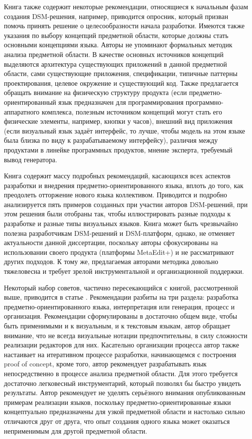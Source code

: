 Книга также содержит некоторые рекомендации, относящиеся к начальным фазам создания 
\ac{DSM}-решения, например, приводится опросник, который призван помочь принять решение о 
целесообразности начала разработки. Имеются также указания по выбору концепций предметной 
области, которые должны стать основными концепциями языка. Авторы не упоминают формальных 
методик анализа предметной области. В качестве основных источников концепций выделяются 
архитектура существующих приложений в данной предметной области, сами существующие приложения, 
спецификации, типичные паттерны проектирования, целевое окружение и существующий код.
 Также предлагается обращать внимание на физическую структуру продукта (если предметно-ориентированный 
язык предназначен для программирования программно-аппаратного комплекса, полезным 
источником концепций могут стать его физические элементы, например, кнопки у часов), 
внешний вид приложения (если визуальный язык задаёт интерфейс, то лучше, чтобы модель 
на этом языке была близка по виду к разрабатываемому интерфейсу), различия между продуктами 
в линейке программных продуктов, мнение эксперта, требуемый вывод генератора.

Книга содержит массу подробных рекомендаций, касающихся всех аспектов разработки и 
внедрения предметно-ориентированного языка, вплоть до того, как преодолеть отторжение 
нового языка коллективом. Приводится и подробно анализируется пять примеров созданных 
при участии авторов \ac{DSM}-решений, при этом решения были отобраны так, чтобы иллюстрировать 
разные подходы к разработке и разные типы визуальных языков. Книга может быть чрезвычайно 
полезна разработчикам \ac{DSM}-решений и \ac{DSM}-платформ, однако, не отменяет актуальности 
данной диссертации, поскольку авторы сфокусированы на использовании своего продукта 
(платформы MetaEdit+) и не рассматривают других подходов. К тому же, предлагаемая 
авторами методика довольно тяжеловесна и требует зрелой инструментальной и организационной 
поддержки.

Некоторый набор советов, частично пересекающийся с книгой, рассмотренной выше, приводится 
в статье \cite{voelter2009best}. Рекомендации разбиты на три раздела: разработка предметно-ориентированного 
языка, интерпретация или генерация, процесс и организация. Рекомендации сформулированы 
в достаточно общем виде, чтобы быть применимыми и к визуальным, и к текстовым языкам, автор 
обращает внимание, что не всегда визуальные нотации предпочтительны, в силу сложности 
реализации редакторов для них. Касательно организации процесса автор также настаивает 
на итеративном процессе разработки, начинающемся с построения proof of concept, кроме 
того, автор рекомендует разрабатывать язык непосредственно в процессе анализа предметной 
области. Для этого требуется достаточно легковесный инструментарий, который позволял 
бы быстро увидеть результаты. Автор рекомендует не уделять серьёзного внимания опубликованным 
примерам реализации языков, поскольку предметно-ориентированные языки концептуально 
предназначены для узкой предметной области и настолько сильно отличаются друг от друга, 
что опыт создания одного языка может оказаться неприменимым для другой предметной области.

